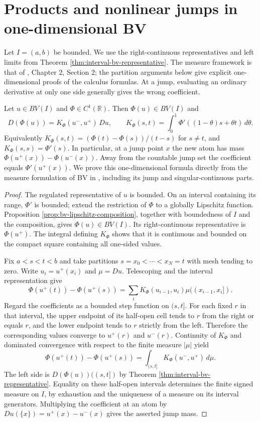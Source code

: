 \chapter{Products and nonlinear jumps in one-dimensional BV}\label{sec:bv-interval-jump-calculus}
Let $I=(a,b)$ be bounded. We use the right-continuous representatives and left limits from Theorem \ref{thm:interval-bv-representative}. The measure framework is that of \cite{Sim18}, Chapter 2, Section 2; the partition arguments below give explicit one-dimensional proofs of the calculus formulas. At a jump, evaluating an ordinary derivative at only one side generally gives the wrong coefficient.

\begin{theorem}\label{thm:interval-bv-chain-rule}
Let $u\in BV(I)$ and $\Phi\in C^1(\mathbb R)$. Then $\Phi(u)\in BV(I)$ and
\[
 D(\Phi(u))=K_\Phi(u^-,u^+)\,Du,
 \qquad K_\Phi(s,t)=\int_0^1\Phi'((1-\theta)s+\theta t)\,d\theta.
\]
Equivalently $K_\Phi(s,t)=(\Phi(t)-\Phi(s))/(t-s)$ for $s\ne t$, and $K_\Phi(s,s)=\Phi'(s)$. In particular, at a jump point $x$ the new atom has mass $\Phi(u^+(x))-\Phi(u^-(x))$. Away from the countable jump set the coefficient equals $\Phi'(u^+(x))$.
We prove this one-dimensional formula directly from the measure formulation of BV in \cite{Sim18}, including its jump and singular-continuous parts.
\end{theorem}
\begin{proof}
The regulated representative of $u$ is bounded. On an interval containing its range, $\Phi'$ is bounded; extend the restriction of $\Phi$ to a globally Lipschitz function. Proposition \ref{prop:bv-lipschitz-composition}, together with boundedness of $I$ and the composition, gives $\Phi(u)\in BV(I)$. Its right-continuous representative is $\Phi(u^+)$. The integral defining $K_\Phi$ shows that it is continuous and bounded on the compact square containing all one-sided values.

Fix $a<s<t<b$ and take partitions $s=x_0<\cdots<x_N=t$ with mesh tending to zero. Write $u_i=u^+(x_i)$ and $\mu=Du$. Telescoping and the interval representation give
\[
 \Phi(u^+(t))-\Phi(u^+(s))
 =\sum_iK_\Phi(u_{i-1},u_i)\mu((x_{i-1},x_i]).
\]
Regard the coefficients as a bounded step function on $(s,t]$. For each fixed $r$ in that interval, the upper endpoint of its half-open cell tends to $r$ from the right or equals $r$, and the lower endpoint tends to $r$ strictly from the left. Therefore the corresponding values converge to $u^+(r)$ and $u^-(r)$. Continuity of $K_\Phi$ and dominated convergence with respect to the finite measure $|\mu|$ yield
\[
 \Phi(u^+(t))-\Phi(u^+(s))
 =\int_{(s,t]}K_\Phi(u^-,u^+)\,d\mu.
\]
The left side is $D(\Phi(u))((s,t])$ by Theorem \ref{thm:interval-bv-representative}. Equality on these half-open intervals determines the finite signed measure on $I$, by exhaustion and the uniqueness of a measure on its interval generators. Multiplying the coefficient at an atom by $Du(\{x\})=u^+(x)-u^-(x)$ gives the asserted jump mass.
\end{proof}

